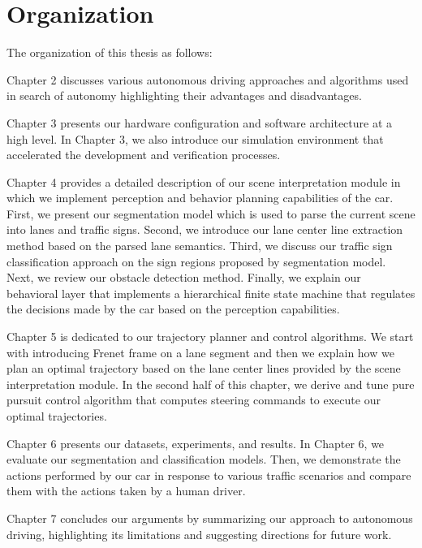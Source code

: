 \section{Organization}

The organization of this thesis as follows:

Chapter 2 discusses various autonomous driving approaches and algorithms used
in search of autonomy highlighting their advantages and disadvantages.

Chapter 3 presents our hardware configuration and software architecture at a
high level. In Chapter 3, we also introduce our simulation environment that
accelerated the development and verification processes.

Chapter 4 provides a detailed description of our scene interpretation module in
which we implement perception and behavior planning capabilities of the car.
First, we present our segmentation model which is used to parse the current
scene into lanes and traffic signs. Second, we introduce our lane center line
extraction method based on the parsed lane semantics. Third, we discuss our
traffic sign classification approach on the sign regions proposed by
segmentation model. Next, we review our obstacle detection method. Finally,
we explain our behavioral layer that implements a hierarchical finite state
machine that regulates the decisions made by the car based on the perception
capabilities.

Chapter 5 is dedicated to our trajectory planner and control algorithms. We
start with introducing Frenet frame on a lane segment and then we explain how
we plan an optimal trajectory based on the lane center lines provided by the
scene interpretation module. In the second half of this chapter, we derive and
tune pure pursuit control algorithm that computes steering commands to execute
our optimal trajectories.

Chapter 6 presents our datasets, experiments, and results. In Chapter 6, we
evaluate our segmentation and classification models. Then, we demonstrate the
actions performed by our car in response to various traffic scenarios and
compare them with the actions taken by a human driver.

Chapter 7 concludes our arguments by summarizing our approach to autonomous
driving, highlighting its limitations and suggesting directions for future
work.
